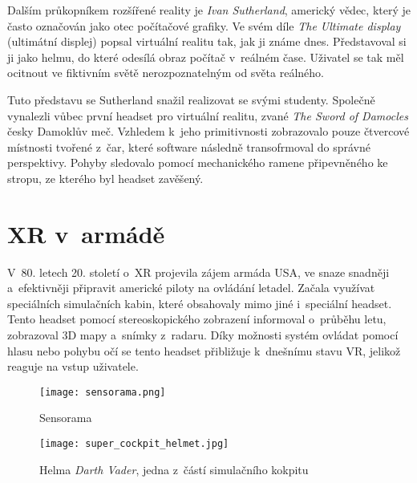 Dalším průkopníkem rozšířené reality je \textit{Ivan Sutherland}, americký vědec, který je často označován jako otec počítačové grafiky. Ve svém díle \textit{The Ultimate display} (ultimátní displej) popsal virtuální realitu tak, jak ji známe dnes. Představoval si ji jako helmu, do které odesílá obraz počítač v~reálném čase. Uživatel se tak měl ocitnout ve fiktivním světě nerozpoznatelným od světa reálného. \cite{otechnice} \cite{ivan_sutherland_bio}

Tuto představu se Sutherland snažil realizovat se svými studenty. Společně vynalezli vůbec první headset pro virtuální realitu, zvané \textit{The Sword of Damocles} \poml česky Damoklův meč. Vzhledem k~jeho primitivnosti zobrazovalo pouze čtvercové místnosti tvořené z~čar, které software následně transofrmoval do správné perspektivy. Pohyby sledovalo pomocí mechanického ramene připevněného ke stropu, ze kterého byl headset zavěšený. \cite{otechnice} \cite{Rheingold_1992}

\section{XR v~armádě}

V~80. letech 20. století o~XR projevila zájem armáda USA, ve snaze snadněji a~efektivněji připravit americké piloty na ovládání letadel. Začala využívat speciálních simulačních kabin, které obsahovaly mimo jiné i~speciální headset. Tento headset pomocí stereoskopického zobrazení informoval o~průběhu letu, zobrazoval 3D mapy a~snímky z~radaru. Díky možnosti systém ovládat pomocí hlasu nebo pohybu očí se tento headset přibližuje k~dnešnímu stavu VR, jelikož reaguje na vstup uživatele. \cite{otechnice}


\begin{figure}[H]
    \centering

    \begin{minipage}{.5\textwidth}
        \centering
        \texttt{[image: sensorama.png]}
        \caption{Sensorama \cite{sensorama_patent}}
        \label{sensorama_fig}
    \end{minipage}%
    \begin{minipage}{.5\textwidth}
        \centering
        \texttt{[image: super\_cockpit\_helmet.jpg]}
        \caption{Helma \textit{Darth Vader}, jedna z~částí simulačního kokpitu \cite{super_cockpit_image}}
        \label{sensorama}
    \end{minipage}

\end{figure}

